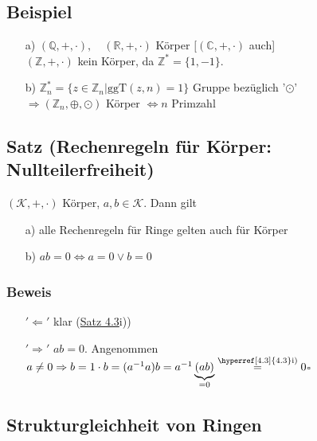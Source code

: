 \documentclass[a4paper, 12pt,titlepage, pdf, headsepline]{scrartcl}
\newcommand{\qed}{\hfill$\square$}
\renewcommand{\>}{\rightarrow}
\renewcommand{\*}{\cdot}
\begin{document}
	      \subsection{Beispiel}
	      \begin{itemize}
	      	\item[a)] $(\mathds{Q},+,\cdot),\quad (\mathds{R},+,\cdot)$ Körper $[(\mathds{C},+,\cdot)$ auch] \\
	      	      $(\mathds{Z},+,\cdot)$ kein Körper, da $\mathds{Z}^* = \{1,-1\}$.
	      	\item[b)] $\mathds{Z}_n^* = \{z \in \mathds{Z}_n| \text{ggT}(z,n) = 1\}$ Gruppe bezüglich '$\odot$'\\
	      	      $\Rightarrow (\mathds{Z}_n, \oplus, \odot)$ Körper $\Leftrightarrow n$ Primzahl
	      \end{itemize}
	      	
	      \subsection{Satz (Rechenregeln für Körper: Nullteilerfreiheit)}
	      \label{4.7}	
	      $(\mathcal{K},+,\cdot)$ Körper, $a,b \in \mathcal{K}$. Dann gilt
	      \begin{itemize}
	      	\item[a)] alle Rechenregeln für Ringe gelten auch für Körper
	      	\item[b)] $ab = 0 \Leftrightarrow a = 0\vee b = 0$ \qquad [Gegenbeispiel: $(\mathds{Z}_6, \oplus, \odot)$, weil $2 \odot 3 = 0$]
	      \end{itemize}
	      \subsubsection*{Beweis}
	      \begin{itemize}
	      	\item[$'\Leftarrow'$] klar (\hyperref[4.3]{Satz 4.3}i))
	      	\item[$'\Rightarrow'$] $ab = 0$. Angenommen $a \neq 0 \Rightarrow b=1 \cdot b = (a^{-1}a)b = a^{-1}\underbrace{(ab)}_{= 0} \overset{\textrm{\hyperref[4.3]{4.3}i)}}{=} 0$\qed
	      \end{itemize}
	      	
	      \subsection*{Strukturgleichheit von Ringen}
\end{document}
